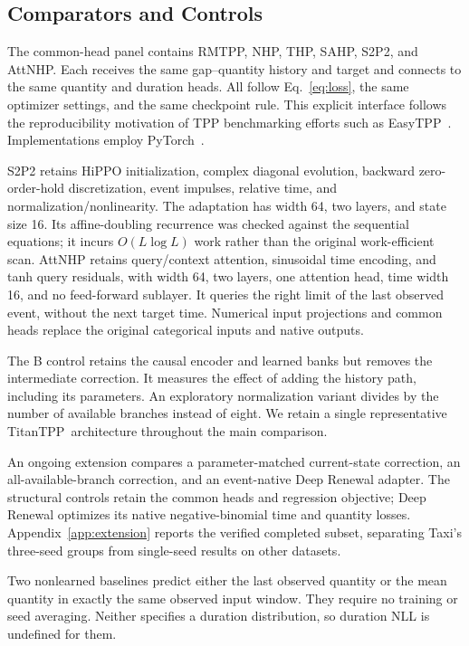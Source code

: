 \documentclass[runningheads]{llncs}
\newcommand{\method}{TitanTPP}
\begin{document}
\subsection{Comparators and Controls}
The common-head panel contains RMTPP, NHP, THP, SAHP, S2P2, and AttNHP.
Each receives the same gap--quantity history and target and connects to the
same quantity and duration heads. All follow Eq.~\eqref{eq:loss}, the same
optimizer settings, and the same checkpoint rule. This explicit interface
follows the reproducibility motivation of TPP benchmarking efforts such as
EasyTPP~\cite{xue2024easytpp}. Implementations employ
PyTorch~\cite{paszke2019pytorch}.

S2P2 retains HiPPO initialization, complex diagonal evolution, backward
zero-order-hold discretization, event impulses, relative time, and
normalization/nonlinearity. The adaptation has width 64, two layers, and
state size 16. Its affine-doubling recurrence was checked against the
sequential equations; it incurs $O(L\log L)$ work rather than the original
work-efficient scan. AttNHP retains query/context attention, sinusoidal time
encoding, and tanh query residuals, with width 64, two layers, one attention
head, time width 16, and no feed-forward sublayer. It queries the right limit
of the last observed event, without the next target time. Numerical input
projections and common heads replace the original categorical inputs and
native outputs.

The B control retains the causal encoder and learned banks but removes the
intermediate correction. It measures the effect of adding the history path,
including its parameters. An exploratory normalization variant divides by
the number of available branches instead of eight. We retain a single
representative \method\ architecture throughout the main comparison.

An ongoing extension compares a parameter-matched current-state correction,
an all-available-branch correction, and an event-native Deep Renewal adapter.
The structural controls retain the common heads and regression objective;
Deep Renewal optimizes its native negative-binomial time and quantity losses.
Appendix~\ref{app:extension} reports the verified completed subset, separating
Taxi's three-seed groups from single-seed results on other datasets.

Two nonlearned baselines predict either the last observed quantity or the
mean quantity in exactly the same observed input window. They require no
training or seed averaging. Neither specifies a duration distribution, so
duration NLL is undefined for them.
\end{document}
